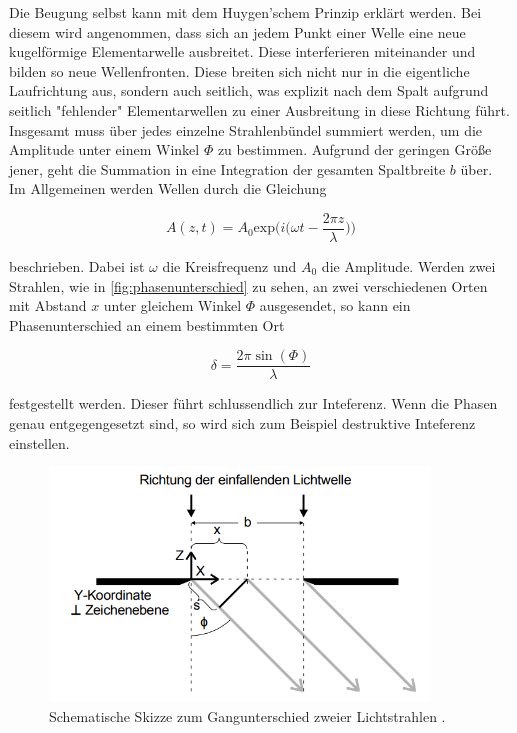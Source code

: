 Die Beugung selbst kann mit dem Huygen'schem Prinzip erklärt werden.
Bei diesem wird angenommen, dass sich an jedem Punkt einer Welle eine neue kugelförmige Elementarwelle ausbreitet.
Diese interferieren miteinander und bilden so neue Wellenfronten.
Diese breiten sich nicht nur in die eigentliche Laufrichtung aus, sondern auch seitlich, was explizit nach dem Spalt aufgrund seitlich "fehlender" Elementarwellen zu einer Ausbreitung in diese Richtung führt.
Insgesamt muss über jedes einzelne Strahlenbündel summiert werden, um die Amplitude unter einem Winkel $\Phi$ zu bestimmen.
Aufgrund der geringen Größe jener, geht die Summation in eine Integration der gesamten Spaltbreite $b$ über.
Im Allgemeinen werden Wellen durch die Gleichung

\begin{equation}
    \label{eqn:wellengleichung}
    A(z,t) = A_0 \text{exp} \bigg( i \bigg( \omega t - \frac{2\pi z}{\lambda} \bigg) \bigg)
\end{equation}

beschrieben. Dabei ist $\omega$ die Kreisfrequenz und $A_0$ die Amplitude.
Werden zwei Strahlen, wie in \autoref{fig:phasenunterschied} zu sehen, an zwei verschiedenen Orten mit Abstand $x$ unter gleichem Winkel $\Phi$ ausgesendet, so kann ein Phasenunterschied an einem bestimmten Ort

\begin{equation}
    \label{eqn:phasenunterschied}
    \delta = \frac{2 \pi \sin (\Phi)}{\lambda}
\end{equation}

festgestellt werden. Dieser führt schlussendlich zur Inteferenz. Wenn die Phasen genau entgegengesetzt sind, so wird sich zum Beispiel destruktive Inteferenz einstellen.

\begin{figure}
    \centering
    \includegraphics[width=0.9\textwidth]{content/phasenunterschied.png}
    \caption{Schematische Skizze zum Gangunterschied zweier Lichtstrahlen \cite{V406}.}
    \label{fig:phasenunterschied}
\end{figure}

